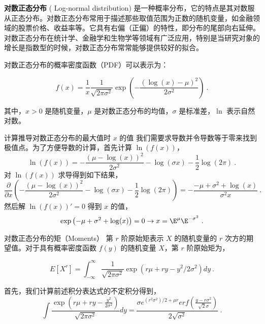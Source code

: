 
\textbf{对数正态分布} (
Log-normal distribution) 是一种概率分布，它的特点是其对数服从正态分布。对数正态分布常用于描述那些取值范围为正数的随机变量，如金融领域的股票价格、收益率等。它具有右偏（正偏）的特性，即分布的尾部向右延伸。对数正态分布在统计学、金融学和生物学等领域有广泛应用，特别是当研究对象的增长是指数型的时候，对数正态分布常常能够提供较好的拟合。

对数正态分布的概率密度函数（PDF）可以表示为：

\begin{equation}
f(x) = \frac{1}{x} \frac{1}{\sqrt{2 \pi \sigma^2}} \exp \left(-\frac{(\log (x)-\mu)^2}{2 \sigma^2}\right)~.
\end{equation}

其中，\( x > 0 \) 是随机变量，\( \mu \) 是对数正态分布的均值，\( \sigma \) 是标准差，\( \ln \) 表示自然对数。

\begin{example}{计算推导对数正态分布的最大值时 \( x \) 的值}
我们需要求导数并令导数等于零来找到极值点。为了方便导数的计算，首先计算 $\ln(f(x))$，
\begin{equation}
    \ln(f(x)) = -\frac{(\mu-\log (x))^2}{2 \sigma^2}-\log (\sigma x)-\frac{1}{2} \log (2 \pi)~.
\end{equation}
对 $\ln(f(x))$ 求导得到如下结果，
\begin{equation}
\frac{\partial}{\partial x}\left(-\frac{(\mu-\log (x))^2}{2 \sigma^2}-\log (\sigma x)-\frac{1}{2} \log (2 \pi)\right) = -\frac{-\mu+\sigma^2+\log (x)}{\sigma^2 x}~.
\end{equation}
然后解 $\ln(f(x))'=0$ 得到 $x$ 的值，
\begin{equation}
    \exp \left({-\mu+\sigma^2+\log (x)}\right) = 0 \rightarrow x = \E^{\mu}\E^{-\sigma^2}~.
\end{equation}
\end{example}
\begin{example}{对数正态分布的矩（Moments）}
第 $r$ 阶原始矩表示 $X$ 的随机变量的 $r$ 次方的期望值。对于具有概率密度函数 $f(y)$ 的随机变量 $X$，第 $r$ 阶原始矩为，

\begin{equation}
E\left[X^r\right]=\int_{-\infty}^{\infty} \frac{1}{\sqrt{2 \pi \sigma^2}} \exp \left(r \mu+r y-y^2 / 2 \sigma^2\right)dy ~.
\end{equation}

首先，我们计算前述积分表达式的不定积分得到，
\begin{equation}
\int \frac{\exp \left(r \mu+r y-\frac{y^2}{2 \sigma^2}\right)}{\sqrt{2 \pi \sigma^2}} d y=\frac{\sigma e^{\left(r^2 \sigma^2\right) / 2+\mu r} erf\left(\frac{y-r \sigma^2}{\sqrt{2} \sigma}\right)}{2 \sqrt{\sigma^2}}~.
\end{equation}

\end{example}